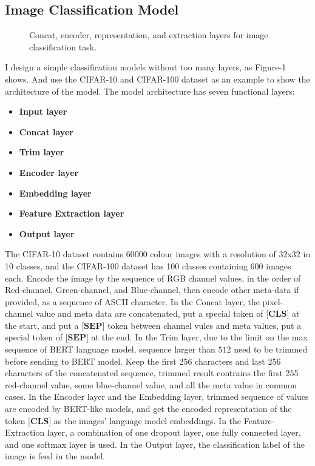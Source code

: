 \documentclass[review]{cvpr}
\begin{document}
\subsection{Image Classification Model}

\begin{figure*}
\begin{center}
\end{center}
   \caption{Concat, encoder, representation, and extraction layers for image classification task.}
\label{fig:short}
\end{figure*}

I design a simple classification models without too many layers, as Figure-1 shows.
And use the CIFAR-10 and CIFAR-100 dataset as an example to show the architecture of the model.
The model architecture has seven functional layers:
\begin{itemize}
\item {\bf Input layer}
\item {\bf Concat layer}
\item {\bf Trim layer}
\item {\bf Encoder layer}
\item {\bf Embedding layer}
\item {\bf Feature Extraction layer}
\item {\bf Output layer}
\end{itemize}

\par The CIFAR-10 dataset contains 60000 colour images with a resolution of 32x32 in 10 classes, and the CIFAR-100 dataset has 100 classes containing 600 images each.
Encode the image by the sequence of RGB channel values, in the order of Red-channel, Green-channel, and Blue-channel,
then encode other meta-data if provided, as a sequence of ASCII character.
In the Concat layer, the pixel-channel value and meta data are concatenated, put a special token of $\textbf{[CLS]}$ at the start,
and put a $\textbf{[SEP]}$ token between channel vules and meta values, put a special token of $\textbf{[SEP]}$ at the end.
In the Trim layer, due to the limit on the max sequence of BERT language model, sequence larger than $512$ need to be trimmed before sending to BERT model.
Keep the first 256 characters and last 256 characters of the concatenated sequence, trimmed result contrains the first 255 red-channel value,
some blue-channel value, and all the meta value in common cases.
In the Encoder layer and the Embedding layer, trimmed sequence of values are encoded by BERT-like models,
and get the encoded representation of the token $\textbf{[CLS]}$ as the images' language model embeddings.
In the Feature-Extraction layer, a combination of one dropout layer, one fully connected layer, and one softmax layer is used.
In the Output layer, the classification label of the image is feed in the model.
\end{document}
